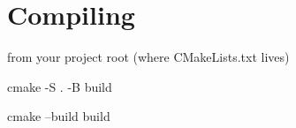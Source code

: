 \chapter{Compiling }
\hypertarget{md__r_e_a_d_m_e}{}\label{md__r_e_a_d_m_e}
\label{md__r_e_a_d_m_e_autotoc_md4}%
%


from your project root (where CMake\+Lists.\+txt lives)

cmake -\/S . -\/B build

cmake --build build 